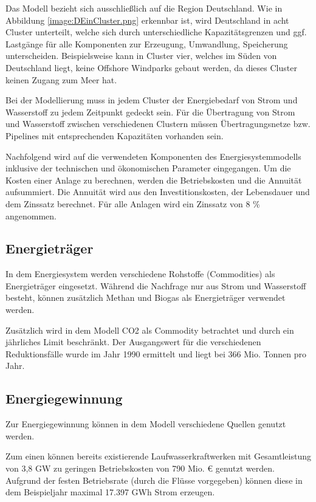 Das Modell bezieht sich ausschließlich auf die Region Deutschland. Wie in Abbildung \ref{image:DEinCluster.png} erkennbar ist, wird Deutschland in acht Cluster unterteilt, welche sich durch unterschiedliche Kapazitätsgrenzen und ggf. Lastgänge für alle Komponenten zur Erzeugung, Umwandlung, Speicherung unterscheiden. Beispielsweise kann in Cluster vier, welches im Süden von Deutschland liegt, keine Offshore Windparks gebaut werden, da dieses Cluster keinen Zugang zum Meer hat. 

Bei der Modellierung muss in jedem Cluster der Energiebedarf von Strom und Wasserstoff zu jedem Zeitpunkt gedeckt sein. Für die Übertragung von Strom und Wasserstoff zwischen verschiedenen Clustern müssen Übertragungsnetze bzw. Pipelines mit entsprechenden Kapazitäten vorhanden sein. 

Nachfolgend wird auf die verwendeten Komponenten des Energiesystemmodells inklusive der technischen und ökonomischen Parameter eingegangen. 
Um die Kosten einer Anlage zu berechnen, werden die Betriebskosten und die Annuität aufsummiert. Die Annuität wird aus den Investitionskosten, der Lebensdauer und dem Zinssatz berechnet. Für alle Anlagen wird ein Zinssatz von 8 \% angenommen.
 
\subsection{Energieträger}
In dem Energiesystem werden verschiedene Rohstoffe (Commodities) als Energieträger eingesetzt. 
Während die Nachfrage nur aus Strom und Wasserstoff besteht, können zusätzlich Methan und Biogas als Energieträger verwendet werden.

Zusätzlich wird in dem Modell CO2 als Commodity betrachtet und durch ein jährliches Limit beschränkt. Der Ausgangswert für die verschiedenen Reduktionsfälle wurde im Jahr 1990 ermittelt und liegt bei 366 Mio. Tonnen pro Jahr. 

\subsection{Energiegewinnung}
Zur Energiegewinnung können in dem Modell verschiedene Quellen genutzt werden.

Zum einen können bereits existierende Laufwasserkraftwerken mit Gesamtleistung von 3,8 GW zu geringen Betriebskosten von 790 Mio. € genutzt werden. Aufgrund der festen Betriebsrate (durch die Flüsse vorgegeben) können diese in dem Beispieljahr maximal 17.397 GWh Strom erzeugen.

